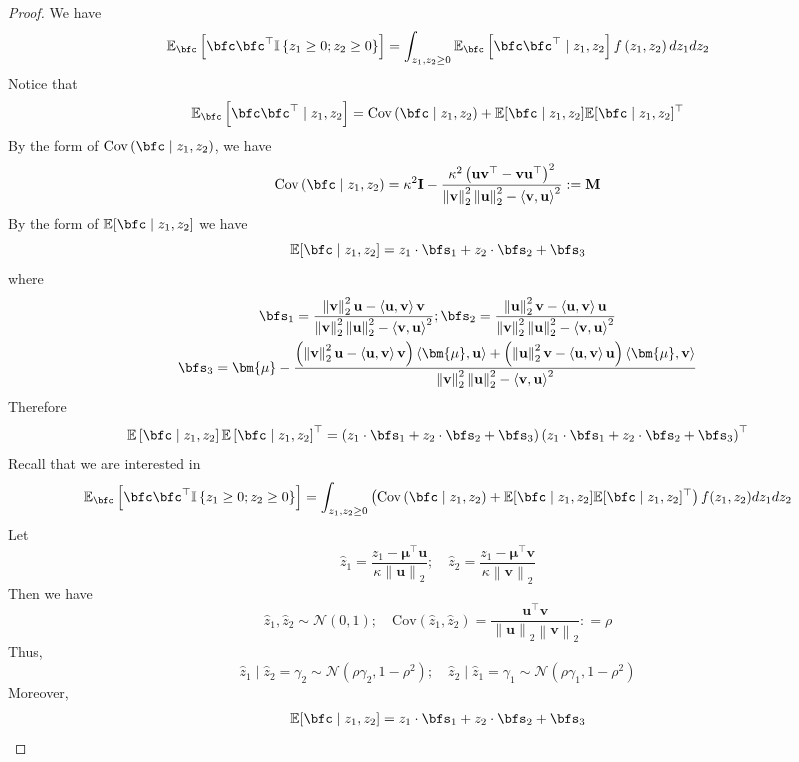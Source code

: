 \documentclass[10pt]{article} %
\theoremstyle{definition}
\theoremstyle{plain}
\newcommand{\paren}[1]{\left(#1\right)}
\newcommand{\norm}[1]{\left\|#1\right\|}
\newcommand{\inner}[2]{\left\langle#1, #2\right\rangle}
\providecommand{\E}{\mathbb{E}}
\def\bfI{{\mathbf{I}}}\def\bfJ{{\mathbf{J}}}\def\bfK{{\mathbf{K}}}\def\bfL{{\mathbf{L}}}
\def\bfM{{\mathbf{M}}}\def\bfN{{\mathbf{N}}}\def\bfO{{\mathbf{O}}}\def\bfP{{\mathbf{P}}}
\def\bfu{{\mathbf{u}}}\def\bfv{{\mathbf{v}}}\def\bfw{{\mathbf{w}}}\def\bfx{{\mathbf{x}}}
\begin{document}
\begin{proof}
    We have
    \[
        \E_{\bfc}\left[\bfc\bfc^\top\mathbb{I}\left\{z_1\geq 0;z_2\geq 0\right\}\right] = \int_{z_1,z_2\geq 0}\E_{\bfc}\left[\bfc\bfc^\top\mid z_1, z_2\right]f\paren{z_1, z_2}dz_1dz_2
    \]
    Notice that
    \[
        \E_{\bfc}\left[\bfc\bfc^\top\mid z_1, z_2\right] = \text{Cov}\paren{\bfc\mid z_1,z_2} + \E[\bfc\mid z_1,z_2]\E[\bfc\mid z_1,z_2]^\top
    \]
    By the form of $\text{Cov}\paren{\bfc\mid z_1,z_2}$, we have
    \[
        \text{Cov}\paren{\bfc\mid z_1,z_2} = \kappa^2\bfI - \frac{\kappa^2\paren{\bfu\bfv^\top - \bfv\bfu^\top}^2}{\norm{\bfv}_2^2\norm{\bfu}_2^2 - \inner{\bfv}{\bfu}^2}  := \bfM
    \]
    By the form of $\E[\bfc\mid z_1,z_2]$ we have
    \[
        \E[\bfc\mid z_1,z_2] = z_1\cdot\bfs_1 + z_2\cdot\bfs_2 + \bfs_3
    \]
    where 
    \begin{gather*}
        \bfs_1 = \frac{\norm{\bfv}_2^2\bfu - \inner{\bfu}{\bfv}\bfv}{\norm{\bfv}_2^2\norm{\bfu}_2^2 - \inner{\bfv}{\bfu}^2};  \bfs_2 = \frac{\norm{\bfu}_2^2\bfv - \inner{\bfu}{\bfv}\bfu}{\norm{\bfv}_2^2\norm{\bfu}_2^2 - \inner{\bfv}{\bfu}^2}\\
        \bfs_3 = \bm{\mu} - \frac{\paren{\norm{\bfv}_2^2\bfu - \inner{\bfu}{\bfv}\bfv}\inner{\bm{\mu}}{\bfu} + \paren{\norm{\bfu}_2^2\bfv - \inner{\bfu}{\bfv}\bfu}\inner{\bm{\mu}}{\bfv}}{\norm{\bfv}_2^2\norm{\bfu}_2^2 - \inner{\bfv}{\bfu}^2}
    \end{gather*}
    Therefore
    \[
        \E\left[\bfc\mid z_1,z_2\right]\E\left[\bfc\mid z_1,z_2\right]^\top = \paren{z_1\cdot\bfs_1 + z_2\cdot\bfs_2 + \bfs_3}\paren{z_1\cdot\bfs_1 + z_2\cdot\bfs_2 + \bfs_3}^\top
    \]
    Recall that we are interested in
    \[
        \E_{\bfc}\left[\bfc\bfc^\top\mathbb{I}\left\{z_1\geq 0;z_2\geq 0\right\}\right] = \int_{z_1,z_2\geq 0}\paren{\text{Cov}\paren{\bfc\mid z_1,z_2} + \E[\bfc\mid z_1,z_2]\E[\bfc\mid z_1,z_2]^\top}f(z_1,z_2)dz_1dz_2
    \]
    Let
    \[
        \hat{z}_1 = \frac{z_1 - \bm{\mu}^\top\bfu}{\kappa\norm{\bfu}_2};\quad \hat{z}_2 = \frac{z_1 - \bm{\mu}^\top\bfv}{\kappa\norm{\bfv}_2}
    \]
    Then we have
    \[
        \hat{z}_1,\hat{z}_2\sim\mathcal{N}(0,1);\quad \text{Cov}\paren{\hat{z}_1,\hat{z}_2} = \frac{\bfu^\top\bfv}{\norm{\bfu}_2\norm{\bfv}_2}: = \rho
    \]
    Thus,
    \[
        \hat{z}_1\mid \hat{z}_2 = \gamma_2 \sim\mathcal{N}\paren{\rho\gamma_2, 1- \rho^2};\quad \hat{z}_2\mid \hat{z}_1 = \gamma_1 \sim\mathcal{N}\paren{\rho\gamma_1, 1- \rho^2}
    \]
    Moreover,
    \begin{align*}
        \E[\bfc\mid z_1,z_2] & = z_1\cdot\bfs_1 + z_2\cdot\bfs_2 + \bfs_3\\

\end{align*}
\end{proof}
\end{document}
